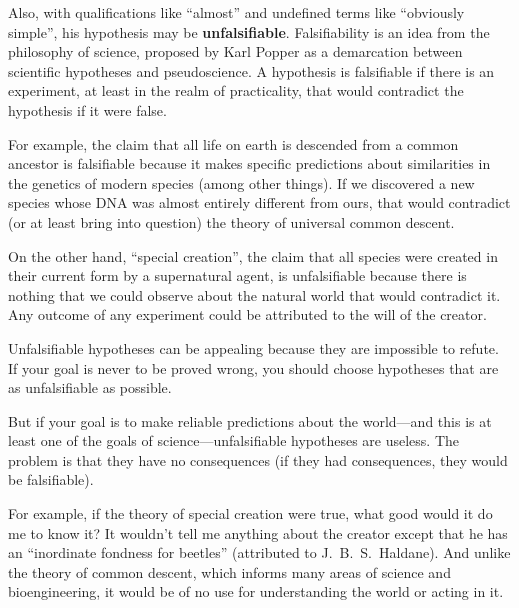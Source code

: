 \documentclass[12pt]{book}
\theoremstyle{exercise}
\begin{document}

Also, with qualifications like
``almost'' and undefined terms like ``obviously simple'', his
hypothesis may be {\bf unfalsifiable}.  Falsifiability is
an idea from the philosophy of science, proposed by Karl Popper
as a demarcation between scientific hypotheses and pseudoscience.
A hypothesis is falsifiable if there is an experiment, at least
in the realm of practicality, that would contradict the hypothesis
if it were false.


For example, the claim that all life on earth is descended
from a common ancestor is falsifiable because it makes specific
predictions about similarities in the genetics of modern species
(among other things).  If we discovered a new species whose
DNA was almost entirely different from ours, that would
contradict (or at least bring into question) the theory of
universal common descent.


On the other hand, ``special creation'', the claim that all species
were created in their current form by a supernatural agent, is
unfalsifiable because there is nothing that we could observe about the
natural world that would contradict it.  Any outcome of any experiment
could be attributed to the will of the creator.


Unfalsifiable hypotheses can be appealing because
they are impossible to refute.  If your goal is never to be
proved wrong, you should choose hypotheses that are as
unfalsifiable as possible.

But if your goal is to make reliable predictions about the world---and
this is at least one of the goals of science---unfalsifiable
hypotheses are useless.  The problem is that they have
no consequences (if they had consequences, they would be
falsifiable).


For example, if the theory of special creation were true, what good
would it do me to know it?  It wouldn't tell me anything about the
creator except that he has an ``inordinate fondness for beetles''
(attributed to J.~B.~S.~Haldane).  And unlike the
theory of common descent, which informs many areas of science
and bioengineering, it would be of no use for understanding
the world or acting in it.

\end{document}
